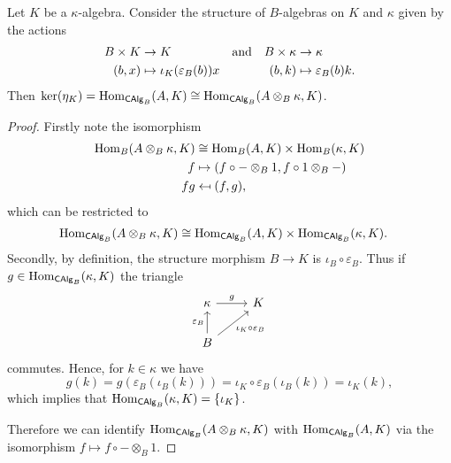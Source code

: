 \begin{prop}\label{prop:ker(eta_K)-1}
    Let\/ $K$ be a\/ $\kappa$-algebra. Consider the structure of\/ $B$-algebras on\/ $K$ and\/ $\kappa$ given by the actions 
    \begin{align*}
        B\times K&\to K
            &{\rm and}&&B\times\kappa&\to\kappa\\
        (b,x)&\mapsto\iota_K(\varepsilon_B(b))x
            &&&(b,k)&\mapsto\varepsilon_B(b)k.
    \end{align*}
    Then\/ $\ker(\eta_K)={\rm Hom}_{\mathsf{CAlg}_B}(A,K)\cong{\rm Hom}_{\mathsf{CAlg}_B}(A\otimes_B\kappa,K)$.
\end{prop}

\newcommand{\mapsfrom}{\mathrel{\reflectbox{\ensuremath{\mapsto}}}}

\begin{proof}
    Firstly note the isomorphism
    \begin{align*}
        \Hom_B(A\otimes_B\kappa,K)&\cong\Hom_B(A,K)\times\Hom_B(\kappa,K)\\
        f&\mapsto(f\circ-\otimes_B1,f\circ1\otimes_B-)\\
        fg &\mapsfrom (f,g),
    \end{align*}
    which can be restricted to
    \begin{align*}
        {\rm Hom}_{\mathsf{CAlg}_B}(A\otimes_B\kappa,K)
            &\cong{\rm Hom}_{\mathsf{CAlg}_B}(A,K)
                \times{\rm Hom}_{\mathsf{CAlg}_B}(\kappa,K).
    \end{align*}
    Secondly, by definition, the structure morphism $B\to K$ is $\iota_B\circ\varepsilon_B$. Thus if $g\in{\rm Hom}_{\mathsf{CAlg}_B}(\kappa,K)$ the triangle
    $$
        \begin{tikzcd}
            \kappa
                    \arrow[r,"g"]
                &K\\
            B
                    \arrow[ru,"\iota_K\circ\varepsilon_B"']
                    \arrow[u,"\varepsilon_B"]
        \end{tikzcd}
    $$
    commutes. Hence, for $k\in\kappa$ we have
    $$
        g(k) = g(\varepsilon_B(\iota_B(k)))
            = \iota_K\circ\varepsilon_B(\iota_B(k))
            = \iota_K(k),
    $$
    which implies that ${\rm Hom}_{\mathsf{CAlg}_B}(\kappa,K)=\{\iota_K\}$.

    Therefore we can identify ${\rm Hom}_{\mathsf{CAlg}_B}(A\otimes_B\kappa,K)$ with ${\rm Hom}_{\mathsf{CAlg}_B}(A,K)$ via the isomorphism $f\mapsto f\circ-\otimes_B1$.


\end{proof}

